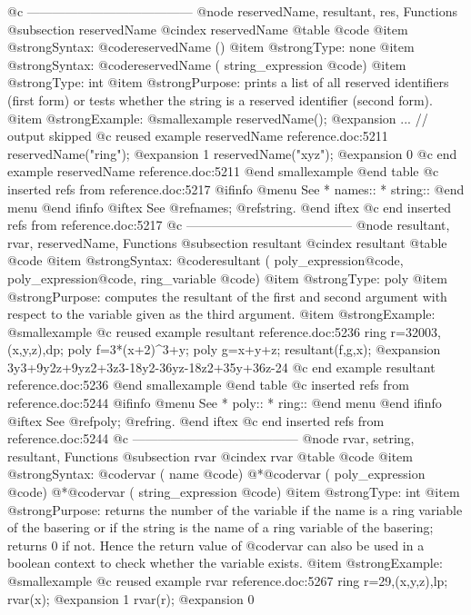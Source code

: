 {{{{{{@c ---------------------------------------
@node reservedName, resultant, res, Functions
@subsection reservedName
@cindex reservedName
@table @code
@item @strong{Syntax:}
@code{reservedName ()}
@item @strong{Type:}
none
@item @strong{Syntax:}
@code{reservedName (} string_expression @code{)}
@item @strong{Type:}
int
@item @strong{Purpose:}
prints a list of all reserved identifiers (first form) or tests
whether the string is a reserved identifier (second form).
@item @strong{Example:}
@smallexample
reservedName();
@expansion{} ... // output skipped
@c reused example reservedName reference.doc:5211 
  reservedName("ring");
@expansion{} 1
  reservedName("xyz");
@expansion{} 0
@c end example reservedName reference.doc:5211
@end smallexample
@end table
@c inserted refs from reference.doc:5217
@ifinfo
@menu
See
* names::
* string::
@end menu
@end ifinfo
@iftex
See
@ref{names};
@ref{string}.
@end iftex
@c end inserted refs from reference.doc:5217
@c ---------------------------------------
@node  resultant, rvar, reservedName, Functions
@subsection resultant
@cindex resultant
@table @code
@item @strong{Syntax:}
@code{resultant (} poly_expression@code{,} poly_expression@code{,} ring_variable @code{)}
@item @strong{Type:}
poly
@item @strong{Purpose:}
computes the resultant of the first and second argument with respect
to the variable given as the third argument.
@item @strong{Example:}
@smallexample
@c reused example resultant reference.doc:5236 
  ring r=32003,(x,y,z),dp;
  poly f=3*(x+2)^3+y;
  poly g=x+y+z;
  resultant(f,g,x);
@expansion{} 3y3+9y2z+9yz2+3z3-18y2-36yz-18z2+35y+36z-24
@c end example resultant reference.doc:5236
@end smallexample
@end table
@c inserted refs from reference.doc:5244
@ifinfo
@menu
See
* poly::
* ring::
@end menu
@end ifinfo
@iftex
See
@ref{poly};
@ref{ring}.
@end iftex
@c end inserted refs from reference.doc:5244
@c ---------------------------------------
@node rvar, setring, resultant, Functions
@subsection rvar
@cindex rvar
@table @code
@item @strong{Syntax:}
@code{rvar (} name @code{)}
@*@code{rvar (} poly_expression @code{)}
@*@code{rvar (} string_expression @code{)}
@item @strong{Type:}
int
@item @strong{Purpose:}
returns the number of the variable if the name is a ring variable of the
basering or if the string is the name of a ring variable of the
basering; returns 0 if not. Hence the return value of @code{rvar} can
also be used in a boolean context to check whether the variable exists.
@item @strong{Example:}
@smallexample
@c reused example rvar reference.doc:5267 
  ring r=29,(x,y,z),lp;
  rvar(x);
@expansion{} 1
  rvar(r);
@expansion{} 0
}}}}}}
